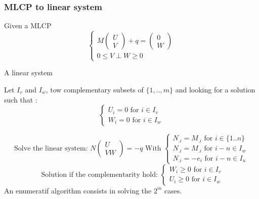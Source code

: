 
\frame
{
\frametitle{MLCP to linear system}
\begin{block}{ Given a MLCP}
 \begin{equation}\label{eq:mlcp1}
 \begin{cases}
M \left(\begin{array}{c}
   U\\
   V
   \end{array}\right) + q = \left(\begin{array}{c}
   0\\
   W
   \end{array}\right) \\
      0 \le V \perp     W   \ge 0

      \end{cases}
\end{equation}


\end{block}

\begin{block}{A linear system}

Let $I_v$ and $I_w$, tow complementary subsets of $\{1,..,m\}$ and
looking for a solution such that : \\
\[
\begin{cases}
U_i=0 \textrm{ for } i \in I_v \\
 W_i=0 \textrm{ for } i \in I_w
\end{cases}
 \]




\[\textrm{Solve the linear system: }N \left(\begin{array}{c}
   U\\
   VW
   \end{array}\right) = -q   \textrm{   With   }
   \begin{cases}
   N_{.i}=M_{.i} \textrm{ for } i \in \{1..n\}\\
   N_{.i}=M_{.i} \textrm{ for } i-n \in I_w\\
   N_{.i}=-e_{i} \textrm{ for } i-n \in I_u
\end{cases}
\]
\[ \textrm { Solution if the complementarity hold: }
\begin{cases}
W_i \ge 0 \textrm{ for } i \in I_v  \\
U_i \ge 0 \textrm{ for } i \in I_w
\end{cases}
\]
An enumeratif algorithm consists in solving the $2^m$ cases.

\end{block}

}

